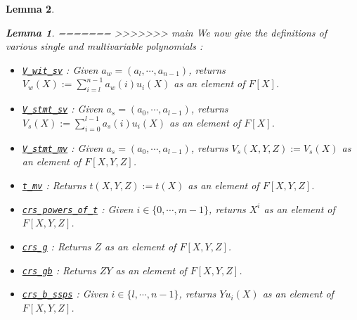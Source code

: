 \documentclass{article}
\newtheorem{lemma}{Lemma}
\theoremstyle{definition}
\theoremstyle{remark}
\begin{document}
\begin{lemma}
\begin{lemma}
=======
>>>>>>> main
We now give the definitions of various single and multivariable polynomials :
\begin{itemize}
  \item \href{https://github.com/BoltonBailey/formal-snarks-project/blob/7fd9cd122f5887f88f6a706b4f2a68a7153c7381/src/snarks/babysnark/knowledge_soundness.lean#L120}{\texttt{V\_wit\_sv}} : Given $a_w = (a_l, \cdots, a_{n - 1})$, returns $V_w(X) := \sum_{i = l}^{n - 1} a_w (i) u_i (X)$ as an element of $F[X]$.
  \item \href{https://github.com/BoltonBailey/formal-snarks-project/blob/7fd9cd122f5887f88f6a706b4f2a68a7153c7381/src/snarks/babysnark/knowledge_soundness.lean#L124}{\texttt{V\_stmt\_sv}} : Given $a_s = (a_0, \cdots, a_{l - 1})$, returns $V_s(X) := \sum_{i = 0}^{l - 1} a_s (i) u_i (X)$ as an element of $F[X]$.
  \item \href{https://github.com/BoltonBailey/formal-snarks-project/blob/7fd9cd122f5887f88f6a706b4f2a68a7153c7381/src/snarks/babysnark/knowledge_soundness.lean#L153}{\texttt{V\_stmt\_mv}} : Given $a_s = (a_0, \cdots, a_{l - 1})$, returns $V_s(X, Y, Z) := V_s(X)$ as an element of $F[X, Y, Z]$.
  \item \href{https://github.com/BoltonBailey/formal-snarks-project/blob/7fd9cd122f5887f88f6a706b4f2a68a7153c7381/src/snarks/babysnark/knowledge_soundness.lean#L150}{\texttt{t\_mv}} : Returns $t(X, Y, Z) := t(X)$ as an element of $F[X, Y, Z]$.
  \item \href{https://github.com/BoltonBailey/formal-snarks-project/blob/7fd9cd122f5887f88f6a706b4f2a68a7153c7381/src/snarks/babysnark/knowledge_soundness.lean#L166}{\texttt{crs\_powers\_of\_t}} : Given $i \in \{ 0, \cdots, m - 1 \}$, returns $X^i$ as an element of $F[X, Y, Z]$.
  \item \href{https://github.com/BoltonBailey/formal-snarks-project/blob/7fd9cd122f5887f88f6a706b4f2a68a7153c7381/src/snarks/babysnark/knowledge_soundness.lean#L167}{\texttt{crs\_g}} : Returns $Z$ as an element of $F[X, Y, Z]$.
  \item \href{https://github.com/BoltonBailey/formal-snarks-project/blob/7fd9cd122f5887f88f6a706b4f2a68a7153c7381/src/snarks/babysnark/knowledge_soundness.lean#L168}{\texttt{crs\_gb}} : Returns $Z Y$ as an element of $F[X, Y, Z]$.
  \item \href{https://github.com/BoltonBailey/formal-snarks-project/blob/7fd9cd122f5887f88f6a706b4f2a68a7153c7381/src/snarks/babysnark/knowledge_soundness.lean#L169}{\texttt{crs\_b\_ssps}} : Given $i \in \{ l, \cdots, n - 1 \}$, returns $Y u_i(X)$ as an element of $F[X, Y, Z]$.
\end{itemize}


\end{lemma}
\end{lemma}
\end{document}

